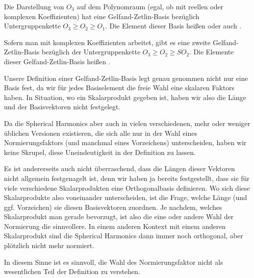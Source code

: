 \pagebreak
\begin{maintheorem}\label{mt:sh_sind_gzb}
	Die Darstellung von $O_3$ auf dem Polynomraum (egal, ob mit reellen oder komplexen Koeffizienten) hat eine Gelfand-Zetlin-Basis bezüglich Untergruppenkette $O_3 \geq O_2 \geq O_1$. Die Element dieser Basis heißen  oder auch .

	Sofern man mit komplexen Koeffizienten arbeitet, gibt es eine zweite Gelfand-Zetlin-Basis bezüglich der Untergruppenkette $O_3 \geq O_2 \geq SO_2$. Die Elemente dieser Gelfand-Zetlin-Basis heißen .
\end{maintheorem}

\begin{remark}
Unsere Definition einer Gelfand-Zetlin-Basis legt genau genommen nicht nur eine Basis fest, da wir für jedes Basiselement die freie Wahl eine skalaren Faktors haben. In Situation, wo ein Skalarprodukt gegeben ist, haben wir also die Länge und der Basisvektoren nicht festgelegt.

Da die Spherical Harmonics aber auch in vielen verschiedenen, mehr oder weniger üblichen Versionen existieren, die sich alle nur in der Wahl eines Normierungsfaktors (und manchmal eines Vorzeichens) unterscheiden, haben wir keine Skrupel, diese Uneindeutigkeit in der Definition zu lassen.

\medbreak
Es ist andererseits auch nicht überraschend, dass die Längen dieser Vektoren nicht allgemein festgenagelt ist, denn wir haben ja bereits festgestellt, dass sie für viele verschiedene Skalarprodukten eine Orthogonalbasis definieren. Wo sich diese Skalarprodukte also voneinander unterscheiden, ist die Frage, welche Länge (und ggf. Vorzeichen) sie diesen Basisvektoren zuordnen. Je nachdem, welches Skalarprodukt man gerade bevorzugt, ist also die eine oder andere Wahl der Normierung die sinnvollere. In einem anderen Kontext mit einem anderen Skalarprodukt sind die Spherical Harmonics dann immer noch orthogonal, aber plötzlich nicht mehr normiert.

In diesem Sinne ist es sinnvoll, die Wahl des Normierungsfaktor nicht als wesentlichen Teil der Definition zu verstehen.
\end{remark}

